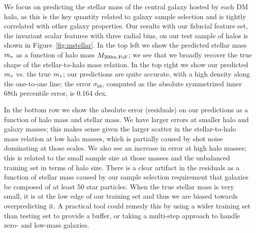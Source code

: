 We focus on predicting the stellar mass of the central galaxy hosted by each DM halo, as this is the key quantity related to galaxy sample selection and is tightly correlated with other galaxy properties.
Our results with our fiducial feature set, the invariant scalar features with three radial bins, on our test sample of halos is shown in Figure~\ref{fig:mstellar}. 
In the top left we show the predicted stellar mass $m_*$ as a function of halo mass $M_\mathrm{200m,FoF}$; we see that we broadly recover the true shape of the stellar-to-halo mass relation. 
In the top right we show our predicted $m_*$ vs. the true $m_*$; our predictions are quite accurate, with a high density along the one-to-one line; the error $\sigma_{68}$, computed as the absolute symmetrized inner 68th percentile error, is 0.164 dex.

In the bottom row we show the absolute error (residuals) on our predictions as a function of halo mass and stellar mass.
We have larger errors at smaller halo and galaxy masses; this makes sense given the larger scatter in the stellar-to-halo mass relation at low halo masses, which is partially caused by shot noise dominating at those scales.
We also see an increase in error at high halo masses; this is related to the small sample size at those masses and the unbalanced training set in terms of halo size.
There is a clear artifact in the residuals as a function of stellar mass caused by our sample selection requirement that galaxies be composed of at least 50 star particles.
When the true stellar mass is very small, it is at the low edge of our training set and thus we are biased towards overpredicting it.
A practical tool could remedy this by using a wider training set than testing set to provide a buffer, or taking a multi-step approach to handle zero- and low-mass galaxies.  


